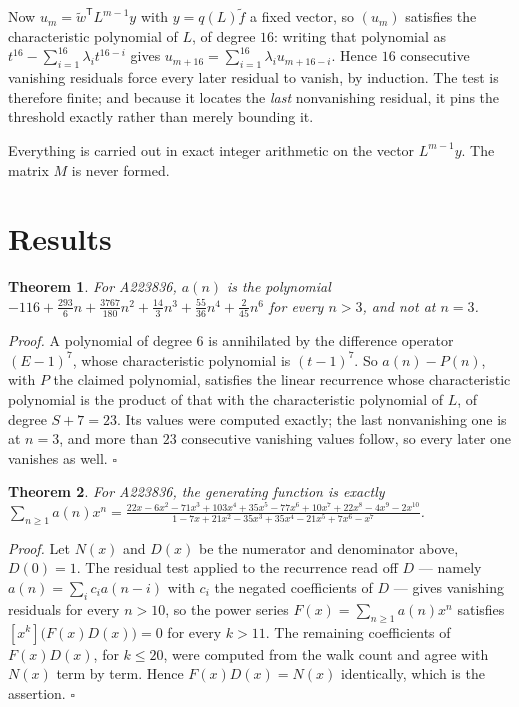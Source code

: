 \documentclass[11pt]{article}
\newtheorem{theorem}{Theorem}
\theoremstyle{definition}
\begin{document}
Now $u_m = \tilde w^{\mathsf T} L^{m-1} y$ with $y = q(L)\tilde f$ a fixed vector, so $(u_m)$ satisfies the characteristic polynomial of $L$, of degree $16$: writing that polynomial as $t^{16} - \sum_{i=1}^{16} \lambda_i t^{16-i}$ gives $u_{m+16} = \sum_{i=1}^{16} \lambda_i u_{m+16-i}$. Hence $16$ consecutive vanishing residuals force every later residual to vanish, by induction. The test is therefore finite; and because it locates the {\itshape last} nonvanishing residual, it pins the threshold exactly rather than merely bounding it.

Everything is carried out in exact integer arithmetic on the vector $L^{m-1}y$. The matrix $M$ is never formed.

\section{Results}

\begin{theorem} For A223836, $a(n)$ is the polynomial $-116 + \frac{293}{6}n + \frac{3767}{180}n^{2} + \frac{14}{3}n^{3} + \frac{55}{36}n^{4} + \frac{2}{45}n^{6}$ for every $n > 3$, and not at $n = 3$.\end{theorem}

{\itshape Proof.} A polynomial of degree $6$ is annihilated by the difference operator $(E-1)^{7}$, whose characteristic polynomial is $(t-1)^{7}$. So $a(n) - P(n)$, with $P$ the claimed polynomial, satisfies the linear recurrence whose characteristic polynomial is the product of that with the characteristic polynomial of $L$, of degree $S + 7 = 23$. Its values were computed exactly; the last nonvanishing one is at $n = 3$, and more than $23$ consecutive vanishing values follow, so every later one vanishes as well. $\square$

\begin{theorem} For A223836, the generating function is exactly $\sum_{n\ge 1} a(n)x^n = \frac{22x - 6x^{2} - 71x^{3} + 103x^{4} + 35x^{5} - 77x^{6} + 10x^{7} + 22x^{8} - 4x^{9} - 2x^{10}}{1 - 7x + 21x^{2} - 35x^{3} + 35x^{4} - 21x^{5} + 7x^{6} - x^{7}}$.\end{theorem}

{\itshape Proof.} Let $N(x)$ and $D(x)$ be the numerator and denominator above, $D(0)=1$. The residual test applied to the recurrence read off $D$ --- namely $a(n) = \sum_i c_i a(n-i)$ with $c_i$ the negated coefficients of $D$ --- gives vanishing residuals for every $n > 10$, so the power series $F(x)=\sum_{n\ge 1}a(n)x^n$ satisfies $[x^k]\bigl(F(x)D(x)\bigr) = 0$ for every $k > 11$. The remaining coefficients of $F(x)D(x)$, for $k \le 20$, were computed from the walk count and agree with $N(x)$ term by term. Hence $F(x)D(x) = N(x)$ identically, which is the assertion. $\square$
\end{document}
